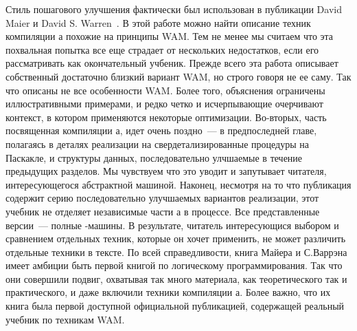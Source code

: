 Стиль пошагового улучшения фактически был использован в публикации David Maier и
David S. Warren\ \cite{MW88}. В этой работе можно найти описание техник компиляции
\prolog а похожие на принципы WAM. Тем не менее мы считаем что эта
похвальная попытка все еще страдает от нескольких недостатков, если его
рассматривать как окончательный учбеник.
Прежде всего эта работа описывает собственный достаточно близкий вариант WAM, но
строго говоря не ее саму. Так что описаны не все особенности WAM.
Более того, объяснения ограничены иллюстративными примерами, и редко четко и
исчерпывающие очерчивают контекст, в котором применяются некоторые оптимизации.
Во-вторых, часть посвященная компиляции \prolog а, идет очень поздно\ --- в
предпоследней главе, полагаясь в деталях реализации на свердетализированные
процедуры на Паскакле, и структуры данных, последовательно улчшаемые в течение
предыдущих разделов. Мы чувствуем что это уводит и запутывает читателя,
интересующегося абстрактной машиной. Наконец, несмотря на то что публикация
содержит серию последовательно улучшаемых вариантов реализации, этот учебник не
отделяет независимые части \prolog а в процессе. Все представленные версии\ ---
полные \prolog-машины. В результате, читатель интересующися выбором и сравнением
отдельных техник, которые он хочет применить, не может различить отдельные
техники в тексте. По всей справедливости, книга Майера и С.Варрэна имеет амбиции
быть первой книгой по логическому программирования. Так что они совершили
подвиг, охватывая так много материала, как теоретического так и практического, и
даже включили техники компиляции \prolog а. Более важно, что их книга была
первой доступной официальной публикацией, содержащей реальный учебник по
техникам WAM.
 
\secdown



\secup
\secup